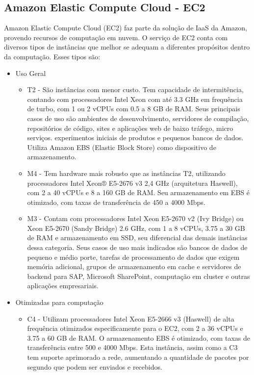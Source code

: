 \documentclass[tg]{mdtufsm}
\begin{document}
\subsection{Amazon Elastic Compute Cloud - EC2}

Amazon Elastic Compute Cloud (EC2) faz parte da solução de IaaS da Amazon, provendo recursos de computação em nuvem. O serviço de EC2 conta com diversos tipos de instâncias que melhor se adequam a diferentes propósitos dentro da computação. Esses tipos são:

\begin{itemize}
\item Uso Geral
	\begin{itemize}
	\item T2 - São instâncias com menor custo. Tem capacidade de intermitência, contando com processadores Intel Xeon com até 3.3 GHz em frequência de turbo, com 1 ou 2 vCPUs com 0.5 a 8 GB de RAM. Seus principais casos de uso são ambientes de desenvolvimento, servidores de compilação, repositórios de código, sites e aplicações web de baixo tráfego, micro serviços. experimentos iniciais de produtos e pequenos bancos de dados. Utiliza Amazon EBS (Elastic Block Store) como dispositivo de armazenamento.
	\item M4 - Tem hardware mais robusto que as instâncias T2, utilizando processadores Intel Xeon® E5-2676 v3 2,4 GHz (arquitetura Haswell), com 2 a 40 vCPUs e 8 a 160 GB de RAM. Seu armazenamento em EBS é otimizado, com taxas de transferência de 450 a 4000 Mbps.
	\item M3 - Contam com processadores Intel Xeon E5-2670 v2 (Ivy Bridge) ou Xeon E5-2670 (Sandy Bridge) 2.6 GHz, com 1 a 8 vCPUs, 3.75 a 30 GB de RAM e armazenamento em SSD, seu diferencial das demais instâncias dessa categoria. Seus casos de uso mais indicados são bancos de dados de pequeno e médio porte, tarefas de processamento de dados que exigem memória adicional, grupos de armazenamento em cache e servidores de backend para SAP, Microsoft SharePoint, computação em cluster e outras aplicações empresariais.
	\end{itemize}
\item Otimizadas para computação
	\begin{itemize}
	\item C4 - Utilizam processadores Intel Xeon E5-2666 v3 (Haswell) de alta frequência otimizados especificamente para o EC2, com 2 a 36 vCPUs e 3.75 a 60 GB de RAM. O armazenamento EBS é otimizado, com taxas de transferência entre 500 e 4000 Mbps. Esta instância, assim como a C3 tem suporte aprimorado a rede, aumentando a quantidade de pacotes por segundo que podem ser enviados e recebidos.

\end{itemize}
\end{itemize}
\end{document}
